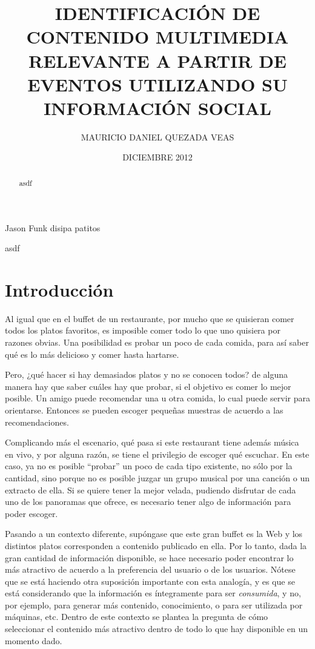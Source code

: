 \documentclass[upright, contnum]{umemoria}
\title{IDENTIFICACIÓN DE CONTENIDO MULTIMEDIA RELEVANTE A PARTIR DE EVENTOS UTILIZANDO SU INFORMACIÓN SOCIAL}
\author{MAURICIO DANIEL QUEZADA VEAS}
\date{DICIEMBRE 2012}
\begin{document}
\maketitle





\begin{abstract}
asdf
\end{abstract}

\begin{dedicatoria}
Jason Funk disipa patitos
\end{dedicatoria}

\begin{thanks}
asdf
\end{thanks}

\cleardoublepage
\tableofcontents

\mainmatter


\chapter{Introducción}
\label{sec-1}


  Al igual que en el buffet de un restaurante, por mucho que se quisieran
  comer todos los platos favoritos, es imposible comer todo lo que uno
  quisiera por razones obvias. Una posibilidad es probar un poco de cada
  comida, para así saber qué es lo más delicioso y comer hasta
  hartarse.
  
  Pero, ¿qué hacer si hay demasiados platos y no se conocen todos? de
  alguna manera hay que saber cuáles hay que probar, si el objetivo es
  comer lo mejor posible. Un amigo puede recomendar una u otra comida,
  lo cual puede servir para orientarse. Entonces se pueden escoger
  pequeñas muestras de acuerdo a las recomendaciones.

  Complicando más el escenario, qué pasa si este restaurant tiene
  además música en vivo, y por alguna razón, se tiene el privilegio de
  escoger qué escuchar. En este caso, ya no es posible ``probar'' un
  poco de cada tipo existente, no sólo por la cantidad, sino porque no
  es posible juzgar un grupo musical por una canción o un extracto de
  ella. Si se quiere tener la mejor velada, pudiendo disfrutar de cada
  uno de los panoramas que ofrece, es necesario tener algo de
  información para poder escoger.
  
  Pasando a un contexto diferente, supóngase que este gran buffet es la
  Web y los distintos platos corresponden a contenido publicado en
  ella. Por lo tanto, dada la gran cantidad de información disponible,
  se hace necesario poder encontrar lo más atractivo de acuerdo a la
  preferencia del usuario o de los usuarios. Nótese que se está
  haciendo otra suposición importante con esta analogía, y es que se
  está considerando que la información es íntegramente para ser
  \emph{consumida}, y no, por ejemplo, para generar más contenido,
  conocimiento, o para ser utilizada por máquinas, etc. Dentro de
  este contexto se plantea la pregunta de cómo seleccionar el contenido
  más atractivo dentro de todo lo que hay disponible en un momento dado.
  
\end{document}

